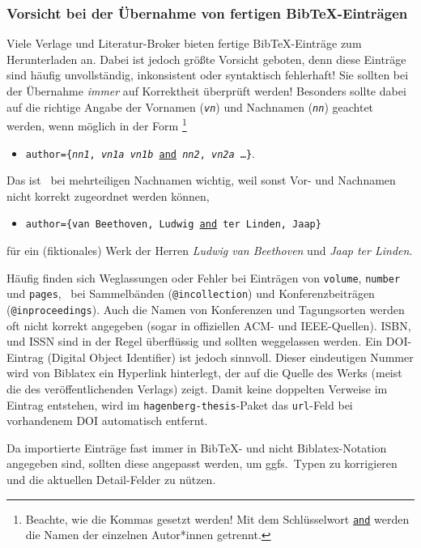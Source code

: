 \subsubsection{Vorsicht bei der Übernahme von fertigen BibTeX-Einträgen}

Viele Verlage und Literatur-Broker bieten fertige BibTeX-Einträge zum
Herunterladen an. Dabei ist jedoch größte Vorsicht geboten, denn diese
Einträge sind häufig unvollständig, inkonsistent oder syntaktisch fehlerhaft!
Sie sollten bei der Übernahme \emph{immer} auf Korrektheit überprüft werden!
Besonders sollte dabei auf die richtige Angabe der Vornamen
(\texttt{\textit{vn}}) und Nachnamen (\texttt{\textit{nn}}) geachtet werden,
wenn möglich in der Form%
\footnote{Beachte, wie die Kommas gesetzt werden! Mit dem Schlüsselwort
\underline{\texttt{and}} werden die Namen der einzelnen Autor*innen getrennt.}
%
\begin{itemize}
\item[]
\texttt{author=\{\textit{nn1}, \textit{vn1a} \emph{vn1b} \underline{and}
\textit{nn2}, \textit{vn2a} \ldots \}}.
\end{itemize}
%
Das ist \va\ bei mehrteiligen Nachnamen wichtig, weil sonst Vor- und
Nachnamen nicht korrekt zugeordnet werden können, \zB
%
\begin{itemize}
\item[]
\texttt{author=\{van Beethoven, Ludwig \underline{and} ter Linden, Jaap\}}
\end{itemize}
%
für ein (fiktionales) Werk der Herren \emph{Ludwig van Beethoven} und
\emph{Jaap ter Linden}.

Häufig finden sich Weglassungen oder Fehler bei Einträgen von
\texttt{volume}, \texttt{number} und \texttt{pages}, \va\ bei Sammelbänden
(\texttt{@incollection}) und Konferenzbeiträgen (\texttt{@inproceedings}).
Auch die Namen von Konferenzen und Tagungsorten werden oft nicht korrekt
angegeben (sogar in offiziellen ACM- und IEEE-Quellen). ISBN, und
ISSN sind in der Regel überflüssig und sollten weggelassen werden.
Ein DOI-Eintrag (Digital Object Identifier) ist jedoch sinnvoll. Dieser
eindeutigen Nummer wird von Biblatex ein Hyperlink hinterlegt, der auf die
Quelle des Werks (meist die des veröffentlichenden Verlags) zeigt. Damit
keine doppelten Verweise im Eintrag entstehen, wird im
\texttt{hagenberg-thesis}-Paket das \texttt{url}-Feld bei vorhandenem DOI
automatisch entfernt.

Da importierte Einträge fast immer in BibTeX- und nicht Biblatex-Notation
angegeben sind, sollten diese angepasst werden, um ggfs.\ Typen zu
korrigieren und die aktuellen Detail-Felder zu nützen.


